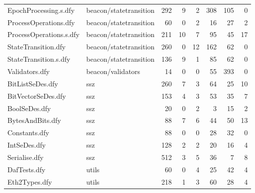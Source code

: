 \documentclass[a4paper, 12pt]{article}
\begin{document}
\begin{tabular}{llrrrrrr}
   EpochProcessing.s.dfy &  beacon/statetransition &   292 &         9 &                2 &            308 &            105 &       0 \\
   ProcessOperations.dfy &  beacon/statetransition &    60 &         0 &                2 &             16 &             27 &       2 \\
 ProcessOperations.s.dfy &  beacon/statetransition &   211 &        10 &                7 &             95 &             45 &      17 \\
     StateTransition.dfy &  beacon/statetransition &   260 &         0 &               12 &            162 &             62 &       0 \\
   StateTransition.s.dfy &  beacon/statetransition &   136 &         9 &                1 &             85 &             62 &       0 \\
          Validators.dfy &       beacon/validators &    14 &         0 &                0 &             55 &            393 &       0 \\
        BitListSeDes.dfy &                     ssz &   260 &         7 &                3 &             64 &             25 &      10 \\
      BitVectorSeDes.dfy &                     ssz &   153 &         4 &                3 &             53 &             35 &       7 \\
           BoolSeDes.dfy &                     ssz &    20 &         0 &                2 &              3 &             15 &       2 \\
        BytesAndBits.dfy &                     ssz &    88 &         7 &                6 &             44 &             50 &      13 \\
           Constants.dfy &                     ssz &    88 &         0 &                0 &             28 &             32 &       0 \\
            IntSeDes.dfy &                     ssz &   128 &         2 &                2 &             20 &             16 &       4 \\
           Serialise.dfy &                     ssz &   512 &         3 &                5 &             36 &              7 &       8 \\
            DafTests.dfy &                   utils &    60 &         0 &                4 &             25 &             42 &       4 \\
           Eth2Types.dfy &                   utils &   218 &         1 &                3 &             60 &             28 &       4 \\

\end{tabular}
\end{document}
